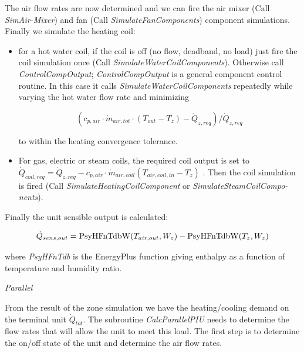 The air flow rates are now determined and we can fire the air mixer (Call \emph{SimAir-Mixer}) and fan (Call \emph{SimulateFanComponents}) component simulations. Finally we simulate the heating coil:

\begin{itemize}
  \item
    for a hot water coil, if the coil is off (no flow, deadband, no load) just fire the coil simulation once (Call \emph{SimulateWaterCoilComponents}). Otherwise call \emph{ControlCompOutput}; \emph{ControlCompOutput} is a general component control routine. In this case it calls \emph{SimulateWaterCoilComponents} repeatedly while varying the hot water flow rate and minimizing

\begin{equation}
  ({c_{p,air}}\cdot {\dot m_{air,tot}}\cdot ({T_{out}} - {T_z}) - {\dot Q_{z,req}})/{\dot Q_{z,req}}
\end{equation}

to within the heating convergence tolerance.
  \item
    For gas, electric or steam coils, the required coil output is set to \({\dot Q_{coil,req}} = {\dot Q_{z,req}} - {c_{p,air}}\cdot {\dot m_{air,coil}}({T_{air,coil,in}} - {T_z})\) . Then the coil simulation is fired (Call \emph{SimulateHeatingCoilComponent} or \emph{SimulateSteamCoilCompo-nents}).
\end{itemize}

Finally the unit sensible output is calculated:

\begin{equation}
{\dot Q_{sens,out}} = {\rm{PsyHFnTdbW}}({T_{air,out}},{W_z}) - {\rm{PsyHFnTdbW(}}{T_z},{W_z})
\end{equation}

where \emph{PsyHFnTdb} is the EnergyPlus function giving enthalpy as a function of temperature and humidity ratio.

\emph{Parallel}

From the result of the zone simulation we have the heating/cooling demand on the terminal unit \({\dot Q_{tot}}\). The subroutine \emph{CalcParallelPIU} needs to determine the flow rates that will allow the unit to meet this load. The first step is to determine the on/off state of the unit and determine the air flow rates.

